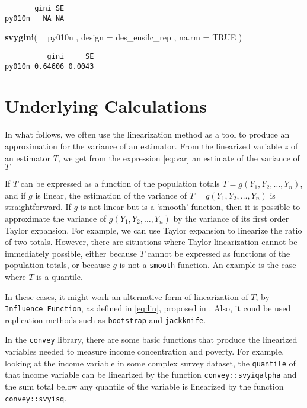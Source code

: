 \documentclass[]{book}
\newenvironment{Shaded}{\begin{snugshade}}{\end{snugshade}}
\newcommand{\DataTypeTok}[1]{\textcolor[rgb]{0.13,0.29,0.53}{#1}}
\newcommand{\KeywordTok}[1]{\textcolor[rgb]{0.13,0.29,0.53}{\textbf{#1}}}
\newcommand{\NormalTok}[1]{#1}
\newcommand{\OperatorTok}[1]{\textcolor[rgb]{0.81,0.36,0.00}{\textbf{#1}}}
\newcommand{\OtherTok}[1]{\textcolor[rgb]{0.56,0.35,0.01}{#1}}
\newcommand{\StringTok}[1]{\textcolor[rgb]{0.31,0.60,0.02}{#1}}
\begin{document}
\begin{verbatim}
       gini SE
py010n   NA NA
\end{verbatim}

\begin{Shaded}
\begin{Highlighting}[]
\KeywordTok{svygini}\NormalTok{( }\OperatorTok{~}\StringTok{ }\NormalTok{py010n , }\DataTypeTok{design =}\NormalTok{ des_eusilc_rep , }\DataTypeTok{na.rm =} \OtherTok{TRUE}\NormalTok{ )}
\end{Highlighting}
\end{Shaded}

\begin{verbatim}
          gini     SE
py010n 0.64606 0.0043
\end{verbatim}

\hypertarget{underlying-calculations}{%
\section{Underlying Calculations}\label{underlying-calculations}}

In what follows, we often use the linearization method as a tool to produce an approximation for the variance of an estimator. From the linearized variable \(z\) of an estimator \(T\), we get from the expression \eqref{eq:var} an estimate of the variance of \(T\)

If \(T\) can be expressed as a function of the population totals \(T = g(Y_1, Y_2, \ldots, Y_n)\), and if \(g\) is linear, the estimation of the variance of \(T = g(Y_1, Y_2, \ldots, Y_n)\) is straightforward. If \(g\) is not linear but is a `smooth' function, then it is possible to approximate the variance of \(g(Y_1, Y_2, \ldots, Y_n)\) by the variance of its first order Taylor expansion. For example, we can use Taylor expansion to linearize the ratio of two totals. However, there are situations where Taylor linearization cannot be immediately possible, either because \(T\) cannot be expressed as functions of the population totals, or because \(g\) is not a \texttt{smooth} function. An example is the case where \(T\) is a quantile.

In these cases, it might work an alternative form of linearization of \(T\), by \texttt{Influence\ Function}, as defined in \eqref{eq:lin}, proposed in \citet{deville1999}. Also, it coud be used replication methods such as \texttt{bootstrap} and \texttt{jackknife}.

In the \texttt{convey} library, there are some basic functions that produce the linearized variables needed to measure income concentration and poverty. For example, looking at the income variable in some complex survey dataset, the \texttt{quantile} of that income variable can be linearized by the function \texttt{convey::svyiqalpha} and the sum total below any quantile of the variable is linearized by the function \texttt{convey::svyisq}.
\end{document}
